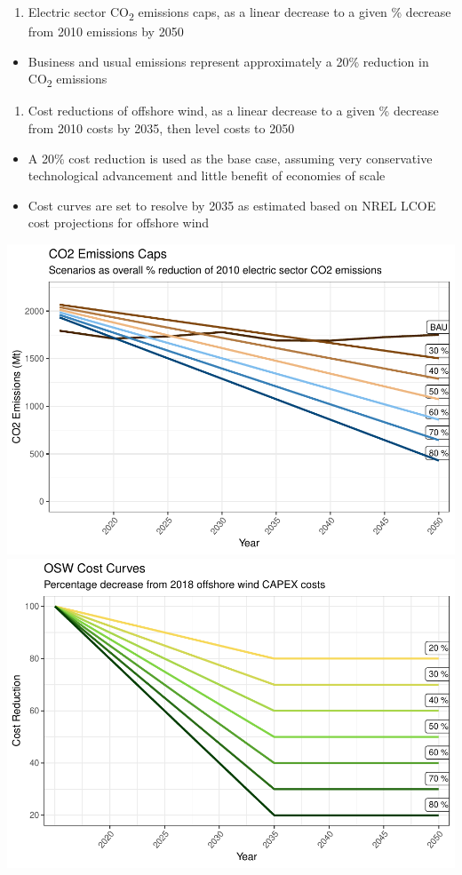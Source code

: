 \documentclass[]{article}
\providecommand{\tightlist}{%
  \setlength{\itemsep}{0pt}\setlength{\parskip}{0pt}}
\begin{document}
\begin{enumerate}
\def\labelenumi{\arabic{enumi}.}
\tightlist
\item
  Electric sector CO\textsubscript{2} emissions caps, as a linear
  decrease to a given \% decrease from 2010 emissions by 2050\\
\end{enumerate}

\begin{itemize}
\tightlist
\item
  Business and usual emissions represent approximately a 20\% reduction
  in CO\textsubscript{2} emissions
\end{itemize}

\begin{enumerate}
\def\labelenumi{\arabic{enumi}.}
\setcounter{enumi}{1}
\tightlist
\item
  Cost reductions of offshore wind, as a linear decrease to a given \%
  decrease from 2010 costs by 2035, then level costs to 2050\\
\end{enumerate}

\begin{itemize}
\tightlist
\item
  A 20\% cost reduction is used as the base case, assuming very
  conservative technological advancement and little benefit of economies
  of scale
\item
  Cost curves are set to resolve by 2035 as estimated based on NREL LCOE
  cost projections for offshore wind
\end{itemize}

\includegraphics[width=0.5\linewidth]{osw_Report_files/figure-latex/unnamed-chunk-4-1}
\includegraphics[width=0.5\linewidth]{osw_Report_files/figure-latex/unnamed-chunk-4-2}
\end{document}
